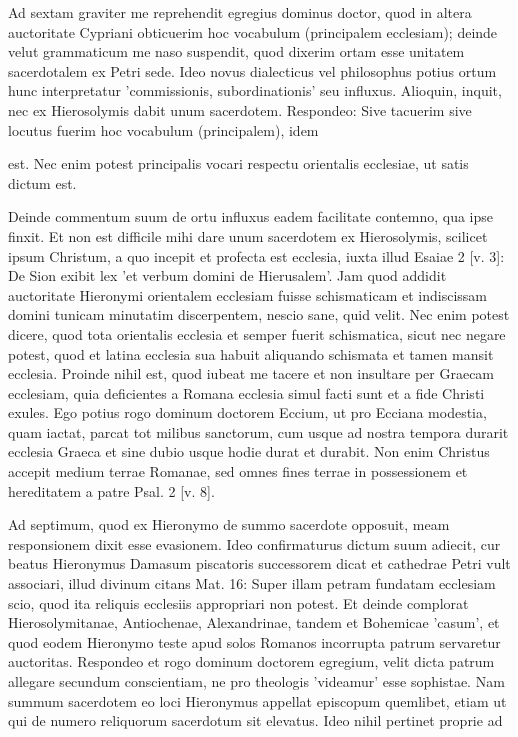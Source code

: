 Ad sextam graviter me reprehendit egregius dominus doctor, quod in altera auctoritate Cypriani obticuerim hoc vocabulum (principalem ecclesiam); deinde velut grammaticum me naso suspendit, quod dixerim ortam esse unitatem sacerdotalem ex Petri sede. Ideo novus dialecticus vel philosophus potius ortum hunc interpretatur 'commissionis, subordinationis' seu influxus. Alioquin, inquit, nec ex Hierosolymis dabit unum sacerdotem. Respondeo: Sive tacuerim sive locutus fuerim hoc vocabulum (principalem), idem

est. Nec enim potest principalis vocari respectu orientalis ecclesiae, ut satis dictum est.

Deinde commentum suum de ortu influxus eadem facilitate contemno, qua ipse finxit. Et non est difficile mihi dare unum sacerdotem ex Hierosolymis, scilicet ipsum Christum, a quo incepit et profecta est ecclesia, iuxta illud Esaiae 2 [v. 3]: De Sion exibit lex 'et verbum domini de Hierusalem'. Jam quod addidit auctoritate Hieronymi orientalem ecclesiam fuisse schismaticam et indiscissam domini tunicam minutatim discerpentem, nescio sane, quid velit. Nec enim potest dicere, quod tota orientalis ecclesia et semper fuerit \marginpar{\small[266]} schismatica, sicut nec negare potest, quod et latina ecclesia sua habuit aliquando schismata et tamen mansit ecclesia. Proinde nihil est, quod iubeat me tacere et non insultare per Graecam ecclesiam, quia deficientes a Romana ecclesia simul facti sunt et a fide Christi exules. Ego potius rogo dominum doctorem Eccium, ut pro Ecciana modestia, quam iactat, parcat tot milibus sanctorum, cum usque ad nostra tempora durarit ecclesia Graeca et sine dubio usque hodie durat et durabit. Non enim Christus accepit medium terrae Romanae, sed omnes fines terrae in possessionem et hereditatem a patre Psal. 2 [v. 8].

Ad septimum, quod ex Hieronymo de summo sacerdote opposuit, meam responsionem dixit esse evasionem. Ideo confirmaturus dictum suum adiecit, cur beatus Hieronymus Damasum piscatoris successorem dicat et cathedrae Petri vult associari, illud divinum citans Mat. 16: Super illam petram fundatam ecclesiam scio, quod ita reliquis ecclesiis appropriari non potest. Et deinde complorat Hierosolymitanae, Antiochenae, Alexandrinae, tandem et Bohemicae 'casum', et quod eodem Hieronymo teste apud solos Romanos incorrupta patrum servaretur auctoritas. Respondeo et rogo dominum doctorem egregium, velit dicta patrum allegare secundum conscientiam, ne pro theologis 'videamur' esse sophistae. Nam summum sacerdotem eo loci Hieronymus appellat episcopum quemlibet, etiam ut qui de numero reliquorum sacerdotum sit elevatus. Ideo nihil pertinet proprie ad


